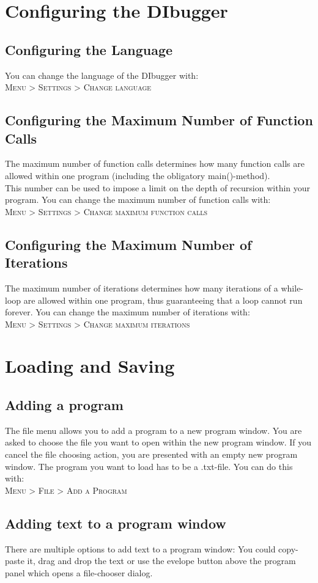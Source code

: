 \documentclass[parskip=full]{memoir}
\begin{document}
\chapter{Configuring the DIbugger} %
\section{Configuring the Language}
You can change the language of the DIbugger with:\\
\textsc{Menu > Settings > Change language}

\section{Configuring the Maximum Number of Function Calls}
The maximum number of function calls determines how many function calls are allowed within one program (including the obligatory main()-method). \\
This number can be used to impose a limit on the depth of recursion within your program.
You can change the maximum number of function calls with:\\
\textsc{Menu > Settings > Change maximum function calls}
\section{Configuring the Maximum Number of Iterations}
The maximum number of iterations determines how many iterations of a while-loop are allowed within one program, thus guaranteeing that a loop cannot run forever.
You can change the maximum number of iterations with: \\
\textsc{Menu > Settings > Change maximum iterations}
\chapter{Loading and Saving} %
\section{Adding a program}
The file menu allows you to add a program to a new program window. You are asked to choose the file you want to open within the new program window. If you cancel the file choosing action, you are presented with an empty new program window. The program you want to load has to be a .txt-file. You can do this with: \\
 \textsc{Menu > File > Add a Program}
 
 \section{Adding text to a program window}
 There are multiple options to add text to a program window: You could copy-paste it, drag and drop the text or use the evelope button above the program panel which opens a file-chooser dialog.
\end{document}

